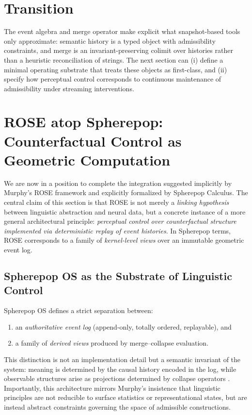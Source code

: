 \documentclass[11pt]{article}
\begin{document}
\section{Transition}
The event algebra and merge operator make explicit what snapshot-based tools only approximate: semantic history is a typed object with admissibility constraints, and merge is an invariant-preserving colimit over histories rather than a heuristic reconciliation of strings. The next section can (i) define a minimal operating substrate that treats these objects as first-class, and (ii) specify how perceptual control corresponds to continuous maintenance of admissibility under streaming interventions.

\section{ROSE atop Spherepop: Counterfactual Control as Geometric Computation}

We are now in a position to complete the integration suggested implicitly by Murphy’s ROSE framework and explicitly formalized by Spherepop Calculus. The central claim of this section is that ROSE is not merely a \emph{linking hypothesis} between linguistic abstraction and neural data, but a concrete instance of a more general architectural principle: \emph{perceptual control over counterfactual structure implemented via deterministic replay of event histories}. In Spherepop terms, ROSE corresponds to a family of \emph{kernel-level views} over an immutable geometric event log.

\subsection{Spherepop OS as the Substrate of Linguistic Control}

Spherepop OS defines a strict separation between:
\begin{enumerate}
\item an \emph{authoritative event log} (append-only, totally ordered, replayable), and
\item a family of \emph{derived views} produced by merge--collapse evaluation.
\end{enumerate}

This distinction is not an implementation detail but a semantic invariant of the system: meaning is determined by the causal history encoded in the log, while observable structures arise as projections determined by collapse operators \cite{turn0file2}. Importantly, this architecture mirrors Murphy’s insistence that linguistic principles are not reducible to surface statistics or representational states, but are instead abstract constraints governing the space of admissible constructions.
\end{document}
